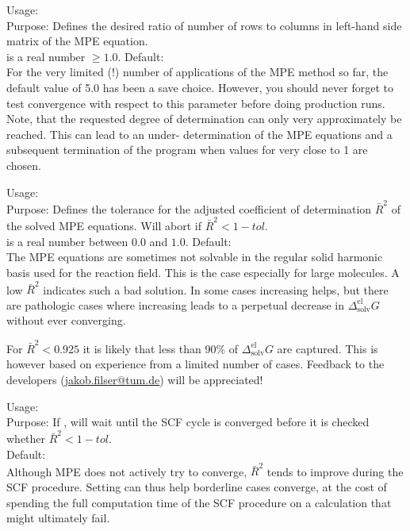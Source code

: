 {
  \noindent
  Usage:  
     \\[1.0ex] 
  Purpose: Defines the desired ratio of number of 
    rows to columns in left-hand side matrix of the 
    MPE equation. \\[1.0ex]
   is a real number $\ge 1.0$. 
    Default:  \\
}
For the very limited (!) number of applications of the MPE 
method so far, the default value of 5.0 has been a save choice. 
However, you should never forget to test convergence with 
respect to this parameter before doing production runs. 
Note, that the requested degree of determination can only 
very approximately be reached. This can lead to an under-
determination of the MPE equations and a subsequent 
termination of the program when values for  
very close to 1 are chosen.


{
  \noindent
  Usage: 
     \\[1.0ex]
  Purpose: Defines the tolerance for the adjusted coefficient
    of determination $\bar{R}^2$ of the solved MPE equations.
    Will abort if $\bar{R}^2 < 1 - tol$. \\[1.0ex]
   is a real number between $0.0$ and $1.0$.
    Default:  \\
}
The MPE equations are sometimes not solvable in the regular
solid harmonic basis used for the reaction field. This is the case
especially for large molecules. A low $\bar{R}^2$ indicates such
a bad solution. In some cases increasing 
helps, but there are pathologic cases where increasing
 leads to a perpetual decrease in
$\Delta_\text{solv}^\text{el}G$ without ever converging.

For $\bar{R}^2 < 0.925$ it is likely that less than 90\%
of $\Delta_\text{solv}^\text{el}G$ are captured. This is however
based on experience from a limited number of cases. Feedback to
the developers (\href{mailto:jakob.filser@tum.de}{\underline{jakob.filser@tum.de}}) will be appreciated!

{
  \noindent
  Usage: 
     \\[1.0ex]
  Purpose: If , will wait until the SCF cycle is
  converged before it is checked whether $\bar{R}^2 < 1 - tol$. \\[1.0ex]
    Default:  \\
}
Although MPE does not actively try to converge, $\bar{R}^2$
tends to improve during the SCF procedure. Setting
 can thus help borderline cases
converge, at the cost of spending the full computation time
of the SCF procedure on a calculation that might ultimately fail.

